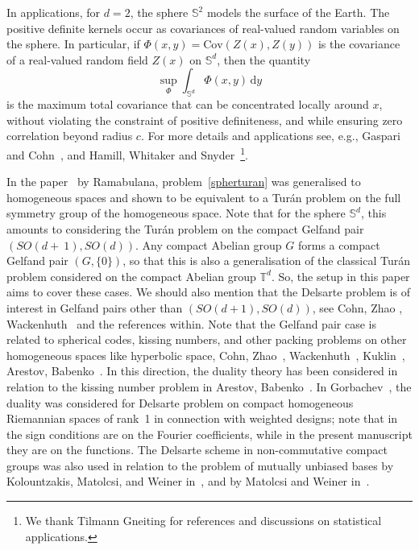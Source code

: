 \documentclass[[a4paper,english,12pt]{amsart}
\theoremstyle{plain}
\theoremstyle{remark}
\begin{document}
In applications, for $d=2$, the sphere \(\mathbb{S}^2\) models the surface of the Earth. The positive definite kernels occur as covariances of real-valued random variables on the sphere. In particular, if \( \Phi(x, y) = \text{Cov}(Z(x), Z(y)) \) is the covariance of a real-valued random field \( Z(x) \) on \( \mathbb{S}^d \), then the quantity
\[
\sup_\Phi \int_{\mathbb{S}^d} \Phi(x, y) \, \mbox{d}y
\]
is the maximum total covariance that can be concentrated locally around \( x \), without violating the constraint of positive definiteness, and while ensuring zero correlation beyond radius \( c \). For more details and applications see, e.g., Gaspari and Cohn~\cite{Gaspari-Cohn}, and Hamill, Whitaker and Snyder~\cite{Hamill}\footnote{We thank Tilmann Gneiting for references and discussions on statistical applications.}. 


In the paper~\cite{ramabulana} by Ramabulana, problem~\eqref{spherturan} was generalised to homogeneous spaces and shown to be equivalent to a Tur\'an problem on the full symmetry group of the homogeneous space. Note that for the sphere \(\mathbb{S}^d\), this amounts to considering the Tur\'an problem on the compact Gelfand pair \((SO(d+~1),SO(d))\). Any compact Abelian group \(G\) forms a compact Gelfand pair \((G, \{0\})\), so that this is also a generalisation of the classical Tur\'an problem considered on the compact Abelian group \(\mathbb{T}^{d}\). So, the setup in this paper aims to cover these cases. We should also mention that the Delsarte problem is of interest in Gelfand pairs other than \((SO(d+1), SO(d))\), see Cohn,  Zhao \cite{cohn-zhao}, Wackenhuth~\cite{wackenhuth} and the references within. Note that the Gelfand pair case is related to spherical codes, kissing numbers, and other packing problems on other homogeneous spaces like hyperbolic space, Cohn,  Zhao~\cite{cohn-zhao},  Wackenhuth~\cite{maximilian}, Kuklin~\cite{kuklin}, Arestov, Babenko~\cite{AB}. In this direction, the duality theory has been considered in relation to the kissing number problem in Arestov, Babenko~\cite{AB}. In Gorbachev~\cite{gorbachevduality}, the duality was considered for Delsarte problem on compact homogeneous Riemannian spaces of rank~1 in connection with weighted designs; note that in \cite{gorbachevduality} the sign conditions are on the Fourier coefficients, while in the present manuscript they are on the functions.  The Delsarte scheme in non-commutative compact groups was also used in relation to the problem of mutually unbiased bases by Kolountzakis, Matolcsi, and Weiner in~\cite{kolmatwei}, and by Matolcsi and Weiner in~\cite{MW}. 
\end{document}
